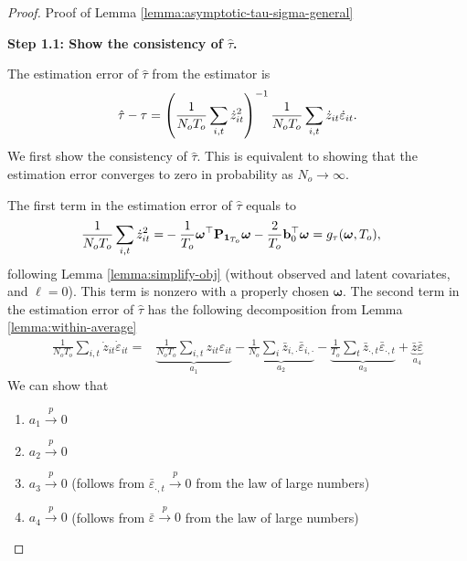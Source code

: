 \begin{proof}{Proof of Lemma \ref{lemma:asymptotic-tau-sigma-general}}

\textbf{Step 1.1: Show the consistency of $\hat{\tau}$.}

The estimation error of $\hat{\tau}$ from the \within estimator is 
\begin{align*}
    \hat{\tau} - \tau = \left(\frac{1}{N_o T_o} \sum_{i, t} \dot{z}^2_{it} \right)^{-1} \frac{1}{N_o T_o}\sum_{i, t} \dot{z}_{it} \dot{\varepsilon}_{it}. 
\end{align*}
We first show the consistency of $\hat{\tau}$. This is equivalent to showing that the estimation error converges to zero in probability as $N_o \rightarrow \infty$. 


The first term in the estimation error of $\hat{\tau}$ equals to
\begin{align*}
    \frac{1}{N_o T_o} \sum_{i,t} \dot{z}^2_{it}  =& - \frac{1}{T_o} \bm{\omega}^\top \mathbf{P}_{\bm{1}_{T_o}}\bm{\omega} - \frac{2}{T_o} \mathbf{b}_0^\top \bm{\omega} = g_\tau(\bm{\omega}, T_o),
\end{align*}
following Lemma \ref{lemma:simplify-obj} (without observed and latent covariates, and $\ell = 0$). This term is nonzero with a properly chosen $\bm{\omega}$.
The second term in the estimation error of $\hat{\tau}$ has the following decomposition from Lemma \ref{lemma:within-average}
\begin{align*}
\frac{1}{N_o T_o} \sum_{i,t} \dot{z}_{it} \dot{\varepsilon}_{it}  =& \underbrace{\frac{1}{N_o T_o} \sum_{i,t} z_{it} \varepsilon_{it}}_{a_1}  - 
 \underbrace{\frac{1}{N_o} \sum_{i} \bar{z}_{i,\cdot} \bar{\varepsilon}_{i,\cdot}}_{a_2} - \underbrace{\frac{1}{T_o} \sum_{t} \bar{z}_{\cdot,t} \bar{\varepsilon}_{\cdot,t}}_{a_3}  + \underbrace{\bar{z} \bar{\varepsilon}}_{a_4} 
\end{align*}
We can show that
\begin{enumerate}
    \item $a_1 \xrightarrow{p} 0$
    \item $a_2 \xrightarrow{p} 0$
    \item $a_3 \xrightarrow{p} 0$ (follows from $\bar{\varepsilon}_{\cdot,t} \xrightarrow{p} 0$ from the law of large numbers)
    \item $a_4 \xrightarrow{p} 0$ (follows from $\bar{\varepsilon} \xrightarrow{p} 0$ from the law of large numbers)
\end{enumerate}


\end{proof}
